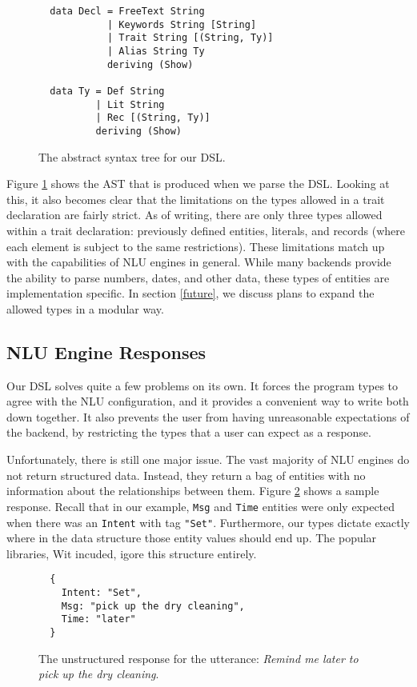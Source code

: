 \documentclass[twocolumn]{article}
\newcommand{\ts}[1]{\texttt{#1}}
\begin{document}
\begin{figure}
\begin{verbatim}
  data Decl = FreeText String
            | Keywords String [String]
            | Trait String [(String, Ty)]
            | Alias String Ty
            deriving (Show)

  data Ty = Def String
          | Lit String
          | Rec [(String, Ty)]
          deriving (Show)
\end{verbatim}
  \caption{The abstract syntax tree for our DSL.}
  \label{fig:ast}
\end{figure}

Figure \ref{fig:ast} shows the AST that is produced when we parse the DSL.
Looking at this, it also becomes clear that the limitations on the types allowed
in a trait declaration are fairly strict. As of writing, there are only three
types allowed within a trait declaration: previously defined entities, literals,
and records (where each element is subject to the same restrictions). These
limitations match up with the capabilities of NLU engines in general. While many
backends provide the ability to parse numbers, dates, and other data, these
types of entities are implementation specific. In section \ref{future}, we
discuss plans to expand the allowed types in a modular way.

\subsection{NLU Engine Responses}
Our DSL solves quite a few problems on its own. It forces the program types to
agree with the NLU configuration, and it provides a convenient way to write both
down together. It also prevents the user from having unreasonable expectations
of the backend, by restricting the types that a user can expect as a response.

Unfortunately, there is still one major issue. The vast majority of NLU engines
do not return structured data. Instead, they return a bag of entities with no
information about the relationships between them. Figure \ref{fig:nostructure}
shows a sample response. Recall that in our example, \ts{Msg} and \ts{Time}
entities were only expected when there was an \ts{Intent} with tag \ts{"Set"}.
Furthermore, our types dictate exactly where in the data structure those entity
values should end up. The popular libraries, Wit incuded, igore this structure
entirely.

\begin{figure}
\begin{verbatim}
  {
    Intent: "Set",
    Msg: "pick up the dry cleaning",
    Time: "later"
  }
\end{verbatim}
  \caption{The unstructured response for the utterance: \emph{Remind me later to
      pick up the dry cleaning}.}
  \label{fig:nostructure}
\end{figure}
\end{document}
